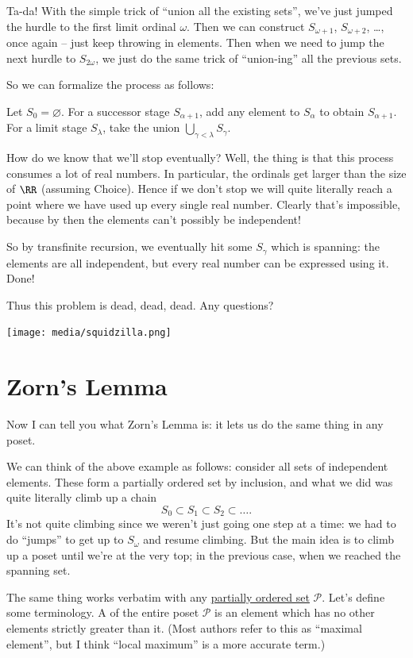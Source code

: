 Ta-da!
With the simple trick of ``union all the existing sets'',
we've just jumped the hurdle to the first limit ordinal $\omega$.
Then we can construct $S_{\omega+1}$, $S_{\omega+2}$, \dots, once again --
just keep throwing in elements.
Then when we need to jump the next hurdle to $S_{2 \omega}$,
we just do the same trick of ``union-ing'' all the previous sets.

So we can formalize the process as follows:
\begin{enumerate}
	\ii Let $S_0 = \varnothing$.
	\ii For a successor stage $S_{\alpha+1}$, add any element to $S_\alpha$ to obtain $S_{\alpha+1}$.
	\ii For a limit stage $S_{\lambda}$, take the union $\bigcup_{\gamma < \lambda} S_\gamma$.
\end{enumerate}
How do we know that we'll stop eventually?
Well, the thing is that this process consumes a lot of real numbers.
In particular, the ordinals get larger than the size of $\RR$ (assuming Choice).
Hence if we don't stop we will quite literally reach a point where we have used up every single real number.
Clearly that's impossible, because by then the elements can't possibly be independent!

So by transfinite recursion, we eventually hit some $S_\gamma$ which is spanning:
the elements are all independent, but every real number can be expressed using it.  Done!


Thus this problem is dead, dead, dead. Any questions?
\begin{center}
	\texttt{[image: media/squidzilla.png]}
\end{center}


\section{Zorn's Lemma}
Now I can tell you what Zorn's Lemma is:
it lets us do the same thing in any poset.

We can think of the above example as follows:
consider all sets of independent elements.
These form a partially ordered set by inclusion, and what we did
was quite literally climb up a chain
\[ S_0 \subset S_1 \subset S_2 \subset \dots. \]
It's not quite climbing since we weren't just going one step at a time:
we had to do ``jumps'' to get up to $S_\omega$ and resume climbing.
But the main idea is to climb up a poset until we're at the very top;
in the previous case, when we reached the spanning set.

The same thing works verbatim with any \href{http://en.wikipedia.org/wiki/Partially_ordered_set}{partially ordered set}
$\mathcal P$.
Let's define some terminology.
A  of the entire poset $\mathcal P$ is an element
which has no other elements strictly greater than it.
(Most authors refer to this as ``maximal element'', but I think
``local maximum'' is a more accurate term.)

